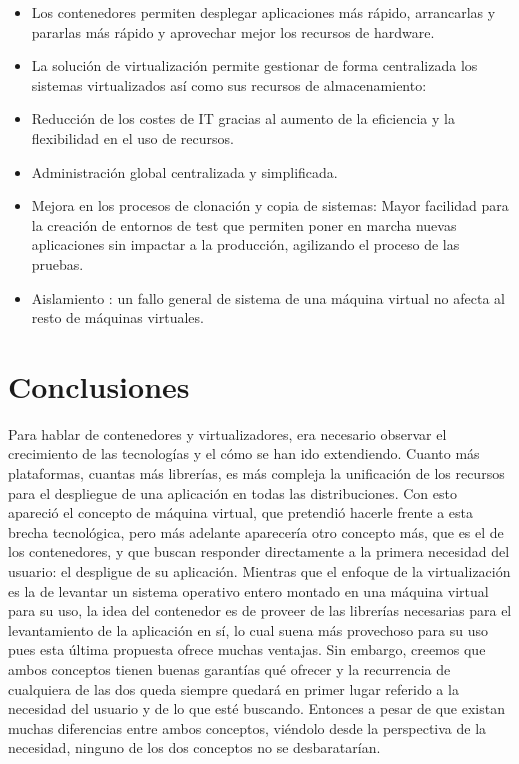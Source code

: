 \documentclass[twoside,twocolumn]{article}
\begin{document}
\begin{itemize}
	\item Los contenedores permiten desplegar aplicaciones más rápido, arrancarlas y pararlas más rápido y aprovechar mejor los recursos de hardware.
	\item La solución de virtualización permite gestionar de forma centralizada los sistemas virtualizados así como sus recursos de almacenamiento:
	\item Reducción de los costes de IT gracias al aumento de la eficiencia y la flexibilidad en el uso de recursos.
	\item Administración global centralizada y simplificada.
	\item Mejora en los procesos de clonación y copia de sistemas: Mayor facilidad para la creación de entornos de test que permiten poner en marcha nuevas aplicaciones sin impactar a la producción, agilizando el proceso de las pruebas.
	\item Aislamiento : un fallo general de sistema de una máquina virtual no afecta al resto de máquinas virtuales.



\end{itemize} 

\section{Conclusiones}

Para hablar de contenedores y virtualizadores, era necesario observar el crecimiento de las tecnologías y el cómo se han ido extendiendo. Cuanto más plataformas, cuantas más librerías, es más compleja la unificación de los recursos para el despliegue de una aplicación en todas las distribuciones. Con esto apareció el concepto de máquina virtual, que pretendió hacerle frente a esta brecha tecnológica, pero más adelante aparecería otro concepto más, que es el de los contenedores, y que buscan responder directamente a la primera necesidad del usuario: el despligue de su aplicación.
Mientras que el enfoque de la virtualización es la de levantar un sistema operativo entero montado en una máquina virtual para su uso, la idea del contenedor es de proveer de las librerías necesarias para el levantamiento de la aplicación en sí, lo cual suena más provechoso para su uso pues esta última propuesta ofrece muchas ventajas. Sin embargo, creemos que ambos conceptos tienen buenas garantías qué ofrecer y la recurrencia de cualquiera de las dos queda siempre quedará en primer lugar referido a la necesidad del usuario y de lo que esté buscando. Entonces a pesar de que existan muchas diferencias entre ambos conceptos, viéndolo desde la perspectiva de la necesidad, ninguno de los dos conceptos no se desbaratarían.
\end{document}
